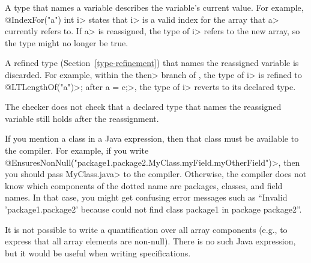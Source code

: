 


A type that names a variable describes the variable's current value.  For
example, \<@IndexFor("a") int i> states that \<i> is a valid index for the
array that \<a> currently refers to.  If \<a> is reassigned, the type of
\<i> refers to the new array, so the type might no longer be true.

A refined type (Section~\ref{type-refinement}) that names the reassigned
variable is discarded.  For example, within the \<then> branch of
, the type of \<i> is refined to
\<@LTLengthOf("a")>; after \<a = c;>, the type of \<i> reverts to its
declared type.

The checker does not check that a declared type that names the reassigned
variable still holds after the reassignment.



If you mention a class in a Java expression, then that class must be
available to the compiler.  For example, if you write
  \<@EnsuresNonNull("package1.package2.MyClass.myField.myOtherField")>,
then you should pass \<MyClass.java> to the compiler.  Otherwise, the
compiler does not know which components of the dotted name are packages,
classes, and field names.  In that case, you might get confusing error
messages such as ``Invalid 'package1.package2' because could not find class
package1 in package package2''.

It is not possible to write a
quantification over all array components (e.g., to express that all
array elements are non-null).  There is no such Java expression, but it
would be useful when writing specifications.



